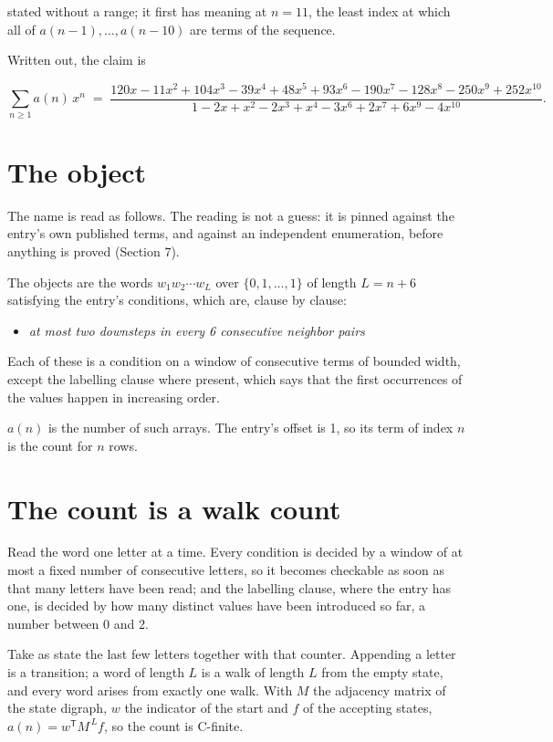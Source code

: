 \documentclass[11pt]{article}
\theoremstyle{definition}
\begin{document}
stated without a range; it first has meaning at $n = 11$, the least index at which all of $a(n-1),\dots,a(n-10)$ are terms of the sequence.

Written out, the claim is

\[\sum_{n \ge 1} a(n)\,x^n \;=\; \frac{120x - 11x^{2} + 104x^{3} - 39x^{4} + 48x^{5} + 93x^{6} - 190x^{7} - 128x^{8} - 250x^{9} + 252x^{10}}{1 - 2x + x^{2} - 2x^{3} + x^{4} - 3x^{6} + 2x^{7} + 6x^{9} - 4x^{10}}.\]

\section{The object}

The name is read as follows. The reading is not a guess: it is pinned against the entry's own published terms, and against an independent enumeration, before anything is proved (Section 7).

The objects are the words $w_1 w_2 \cdots w_L$ over $\{0,1,\dots,1\}$ of length $L = n + 6$ satisfying the entry's conditions, which are, clause by clause:

\begin{itemize}

\item {\itshape at most two downsteps in every 6 consecutive neighbor pairs}

\end{itemize}

Each of these is a condition on a window of consecutive terms of bounded width, except the labelling clause where present, which says that the first occurrences of the values happen in increasing order.

$a(n)$ is the number of such arrays. The entry's offset is 1, so its term of index $n$ is the count for $n$ rows.

\section{The count is a walk count}

Read the word one letter at a time. Every condition is decided by a window of at most a fixed number of consecutive letters, so it becomes checkable as soon as that many letters have been read; and the labelling clause, where the entry has one, is decided by how many distinct values have been introduced so far, a number between $0$ and 2.

Take as state the last few letters together with that counter. Appending a letter is a transition; a word of length $L$ is a walk of length $L$ from the empty state, and every word arises from exactly one walk. With $M$ the adjacency matrix of the state digraph, $w$ the indicator of the start and $f$ of the accepting states, $a(n) = w^{\mathsf T}M^{\,L}f$, so the count is C-finite.
\end{document}
